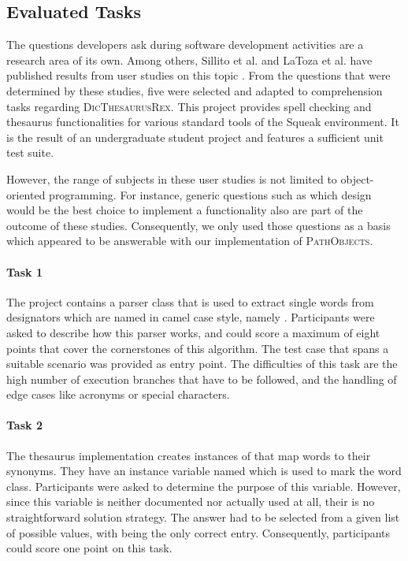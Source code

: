 \subsection{Evaluated Tasks}
The questions developers ask during software development activities are a research area of its own.
Among others, Sillito et al. and LaToza et al. have published results from user studies on this topic \cite{sillito_asking_2008, latoza_hard--answer_2010}.
From the questions that were determined by these studies, five were selected and adapted to comprehension tasks regarding \textsc{DicThesaurusRex}.
This project provides spell checking and thesaurus functionalities for various standard tools of the Squeak environment.
It is the result of an undergraduate student project and features a sufficient unit test suite.

However, the range of subjects in these user studies is not limited to object-oriented programming.
For instance, generic questions such as which design would be the best choice to implement a functionality also are part of the outcome of these studies.
Consequently, we only used those questions as a basis which appeared to be answerable with our implementation of \textsc{PathObjects}.

\paragraph{Task 1} The project contains a parser class that is used to extract single words from designators which are named in camel case style, namely .
Participants were asked to describe how this parser works, and could score a maximum of eight points that cover the cornerstones of this algorithm.
The test case  that spans a suitable scenario was provided as entry point.
The difficulties of this task are the high number of execution branches that have to be followed, and the handling of edge cases like acronyms or special characters.

\paragraph{Task 2} The thesaurus implementation creates instances of  that map words to their synonyms.
They have an instance variable named  which is used to mark the word class.
Participants were asked to determine the purpose of this variable.
However, since this variable is neither documented nor actually used at all, their is no straightforward solution strategy.
The answer had to be selected from a given list of possible values, with  being the only correct entry.
Consequently, participants could score one point on this task.

